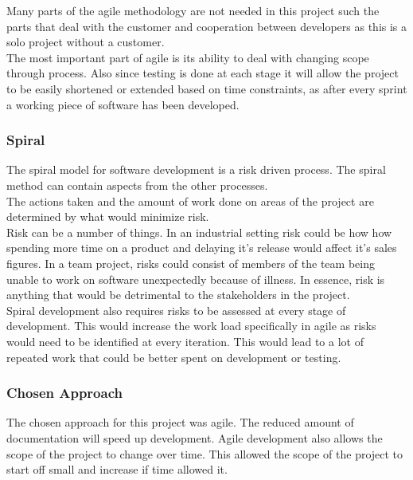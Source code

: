 \documentclass{article}
\begin{document}
Many parts of the agile methodology are not needed in this project such the parts that deal with the customer and cooperation between developers as this is a solo project without a customer.\\

The most important part of agile is its ability to deal with changing scope through process. Also since testing is done at each stage it will allow the project to be easily shortened or extended based on time constraints, as after every sprint a working piece of software has been developed.\\

\subsubsection{Spiral}
The spiral model for software development is a risk driven process. The spiral method can contain aspects from the other processes.\\

The actions taken and the amount of work done on areas of the project are determined by what would minimize risk.\\

Risk can be a number of things. In an industrial setting risk could be how how spending more time on a product and delaying it's release would affect it's sales figures. In a team project, risks could  consist of members of the team being unable to work on software unexpectedly because of illness. In essence, risk is anything that would be detrimental to the stakeholders in the project.\\

Spiral development also requires risks to be assessed at every stage of development. This would increase the work load specifically in agile as risks would need to be identified at every iteration. This would lead to a lot of repeated work that could be better spent on development or testing.  
\subsubsection{Chosen Approach}

The chosen approach for this project was agile. The reduced amount of documentation will speed up development. Agile development also allows the scope of the project to change over time. This allowed the scope of the project to start off small and increase if time allowed it.\\
\end{document}
